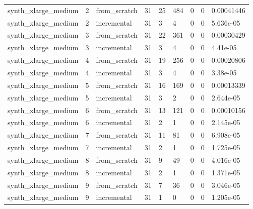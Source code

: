 \begin{table}[t]
\begin{tabular}{lllllllll}
synth\_xlarge\_medium & 2 & from\_scratch & 31 & 25 & 484 & 0 & 0 & 0.00041446 \\
synth\_xlarge\_medium & 2 & incremental & 31 & 3 & 4 & 0 & 0 & 5.636e-05 \\
synth\_xlarge\_medium & 3 & from\_scratch & 31 & 22 & 361 & 0 & 0 & 0.00030429 \\
synth\_xlarge\_medium & 3 & incremental & 31 & 3 & 4 & 0 & 0 & 4.41e-05 \\
synth\_xlarge\_medium & 4 & from\_scratch & 31 & 19 & 256 & 0 & 0 & 0.00020806 \\
synth\_xlarge\_medium & 4 & incremental & 31 & 3 & 4 & 0 & 0 & 3.38e-05 \\
synth\_xlarge\_medium & 5 & from\_scratch & 31 & 16 & 169 & 0 & 0 & 0.00013339 \\
synth\_xlarge\_medium & 5 & incremental & 31 & 3 & 2 & 0 & 0 & 2.644e-05 \\
synth\_xlarge\_medium & 6 & from\_scratch & 31 & 13 & 121 & 0 & 0 & 0.00010156 \\
synth\_xlarge\_medium & 6 & incremental & 31 & 2 & 1 & 0 & 0 & 2.145e-05 \\
synth\_xlarge\_medium & 7 & from\_scratch & 31 & 11 & 81 & 0 & 0 & 6.908e-05 \\
synth\_xlarge\_medium & 7 & incremental & 31 & 2 & 1 & 0 & 0 & 1.725e-05 \\
synth\_xlarge\_medium & 8 & from\_scratch & 31 & 9 & 49 & 0 & 0 & 4.016e-05 \\
synth\_xlarge\_medium & 8 & incremental & 31 & 2 & 1 & 0 & 0 & 1.371e-05 \\
synth\_xlarge\_medium & 9 & from\_scratch & 31 & 7 & 36 & 0 & 0 & 3.046e-05 \\
synth\_xlarge\_medium & 9 & incremental & 31 & 1 & 0 & 0 & 0 & 1.205e-05 \\
\bottomrule
\end{tabular}
\end{table}
